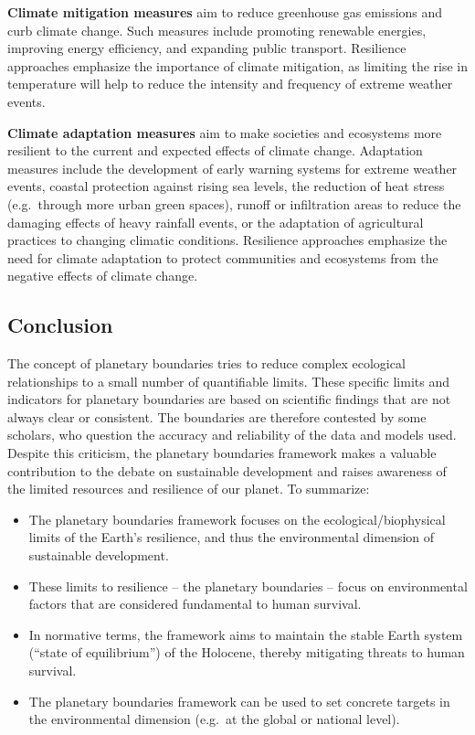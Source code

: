 \documentclass[
  a4paper,
  openany]{book}
\begin{document}
\textbf{Climate mitigation measures} aim to reduce greenhouse gas
emissions and curb climate change. Such measures include promoting
renewable energies, improving energy efficiency, and expanding public
transport. Resilience approaches emphasize the importance of climate
mitigation, as limiting the rise in temperature will help to reduce the
intensity and frequency of extreme weather events.

\textbf{Climate adaptation measures} aim to make societies and
ecosystems more resilient to the current and expected effects of climate
change. Adaptation measures include the development of early warning
systems for extreme weather events, coastal protection against rising
sea levels, the reduction of heat stress (e.g.~through more urban green
spaces), runoff or infiltration areas to reduce the damaging effects of
heavy rainfall events, or the adaptation of agricultural practices to
changing climatic conditions. Resilience approaches emphasize the need
for climate adaptation to protect communities and ecosystems from the
negative effects of climate change.

\subsection{Conclusion}\label{conclusion}

The concept of planetary boundaries tries to reduce complex ecological
relationships to a small number of quantifiable limits. These specific
limits and indicators for planetary boundaries are based on scientific
findings that are not always clear or consistent. The boundaries are
therefore contested by some scholars, who question the accuracy and
reliability of the data and models used. Despite this criticism, the
planetary boundaries framework makes a valuable contribution to the
debate on sustainable development and raises awareness of the limited
resources and resilience of our planet. To summarize:

\begin{itemize}
\item
  The planetary boundaries framework focuses on the
  ecological/biophysical limits of the Earth's resilience, and thus the
  environmental dimension of sustainable development.
\item
  These limits to resilience -- the planetary boundaries -- focus on
  environmental factors that are considered fundamental to human
  survival.
\item
  In normative terms, the framework aims to maintain the stable Earth
  system (``state of equilibrium'') of the Holocene, thereby mitigating
  threats to human survival.
\item
  The planetary boundaries framework can be used to set concrete targets
  in the environmental dimension (e.g.~at the global or national level).
\end{itemize}
\end{document}
